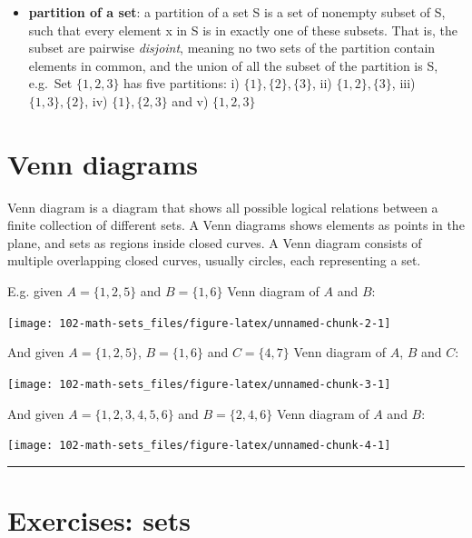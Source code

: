 \documentclass[
]{book}
\providecommand{\tightlist}{%
  \setlength{\itemsep}{0pt}\setlength{\parskip}{0pt}}
\theoremstyle{definition}
\theoremstyle{definition}
\theoremstyle{definition}
\theoremstyle{remark}
\begin{document}
\begin{itemize}
\tightlist
\item
  \textbf{partition of a set}: a partition of a set S is a set of nonempty subset of S, such that every element x in S is in exactly one of these subsets. That is, the subset are pairwise \emph{disjoint}, meaning no two sets of the partition contain elements in common, and the union of all the subset of the partition is S, e.g.~Set \(\{1, 2, 3\}\) has five partitions: i) \(\{1\}, \{2\}, \{3\}\), ii) \(\{1, 2\}, \{3\}\), iii) \(\{1,3\}, \{2\}\), iv) \(\{1\}, \{2, 3\}\) and v) \(\{1,2,3\}\)
\end{itemize}

\hypertarget{venn-diagrams}{%
\section{Venn diagrams}\label{venn-diagrams}}

Venn diagram is a diagram that shows all possible logical relations between a finite collection of different sets. A Venn diagrams shows elements as points in the plane, and sets as regions inside closed curves. A Venn diagram consists of multiple overlapping closed curves, usually circles, each representing a set.

E.g. given \(A = \{1, 2, 5\}\) and \(B = \{1, 6\}\) Venn diagram of \(A\) and \(B\):

\begin{center}\texttt{[image: 102-math-sets\_files/figure-latex/unnamed-chunk-2-1]} \end{center}

And given \(A = \{1, 2, 5\}\), \(B = \{1, 6\}\) and \(C= \{4, 7\}\) Venn diagram of \(A\), \(B\) and \(C\):

\begin{center}\texttt{[image: 102-math-sets\_files/figure-latex/unnamed-chunk-3-1]} \end{center}

And given \(A = \{1, 2, 3, 4, 5, 6\}\) and \(B= \{2, 4, 6\}\) Venn diagram of \(A\) and \(B\):

\begin{center}\texttt{[image: 102-math-sets\_files/figure-latex/unnamed-chunk-4-1]} \end{center}

\begin{center}\rule{0.5\linewidth}{0.5pt}\end{center}

\hypertarget{exercises-sets}{%
\section{Exercises: sets}\label{exercises-sets}}
\end{document}

